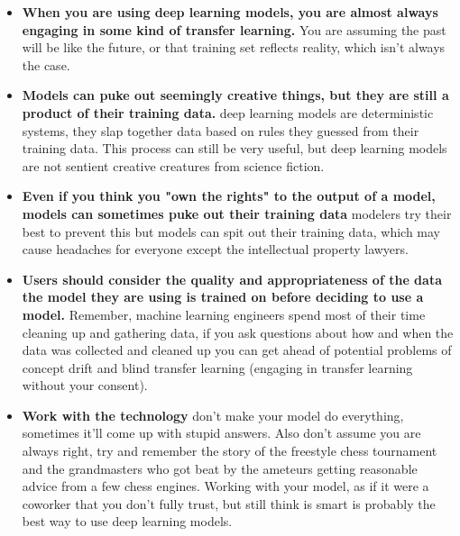 \begin{itemize}
    \item \textbf{When you are using deep learning models, you are almost always engaging in some kind of transfer learning.} You are assuming the past will be like the future, or that training set reflects reality, which isn't always the case. 
    \item \textbf{Models can puke out seemingly creative things, but they are still a product of their training data.} deep learning models are deterministic systems, they slap together data based on rules they guessed from their training data. This process can still be very useful, but deep learning models are not sentient creative creatures from science fiction.
    \item \textbf{Even if you think you "own the rights" to the output of a model, models can sometimes puke out their training data} modelers try their best to prevent this but models can spit out their training data, which may cause headaches for everyone except the intellectual property lawyers. 
    \item \textbf{Users should consider the quality and appropriateness of the data the model they are using is trained on before deciding to use a model.} Remember, machine learning engineers spend most of their time cleaning up and gathering data, if you ask questions about how and when the data was collected and cleaned up you can get ahead of potential problems of concept drift and blind transfer learning (engaging in transfer learning without your consent).
    \item \textbf{Work with the technology} don't make your model do everything, sometimes it'll come up with stupid answers. Also don't assume you are always right, try and remember the story of the freestyle chess tournament and the grandmasters who got beat by the ameteurs getting reasonable advice from a few chess engines. Working with your model, as if it were a coworker that you don't fully trust, but still think is smart is probably the best way to use deep learning models.
\end{itemize}

